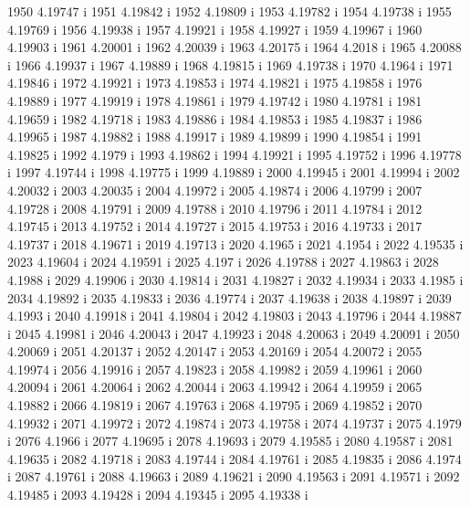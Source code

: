  1950  4.19747  i
 1951  4.19842  i
 1952  4.19809  i
 1953  4.19782  i
 1954  4.19738  i
 1955  4.19769  i
 1956  4.19938  i
 1957  4.19921  i
 1958  4.19927  i
 1959  4.19967  i
 1960  4.19903  i
 1961  4.20001  i
 1962  4.20039  i
 1963  4.20175  i
 1964  4.2018  i
 1965  4.20088  i
 1966  4.19937  i
 1967  4.19889  i
 1968  4.19815  i
 1969  4.19738  i
 1970  4.1964  i
 1971  4.19846  i
 1972  4.19921  i
 1973  4.19853  i
 1974  4.19821  i
 1975  4.19858  i
 1976  4.19889  i
 1977  4.19919  i
 1978  4.19861  i
 1979  4.19742  i
 1980  4.19781  i
 1981  4.19659  i
 1982  4.19718  i
 1983  4.19886  i
 1984  4.19853  i
 1985  4.19837  i
 1986  4.19965  i
 1987  4.19882  i
 1988  4.19917  i
 1989  4.19899  i
 1990  4.19854  i
 1991  4.19825  i
 1992  4.1979  i
 1993  4.19862  i
 1994  4.19921  i
 1995  4.19752  i
 1996  4.19778  i
 1997  4.19744  i
 1998  4.19775  i
 1999  4.19889  i
 2000  4.19945  i
 2001  4.19994  i
 2002  4.20032  i
 2003  4.20035  i
 2004  4.19972  i
 2005  4.19874  i
 2006  4.19799  i
 2007  4.19728  i
 2008  4.19791  i
 2009  4.19788  i
 2010  4.19796  i
 2011  4.19784  i
 2012  4.19745  i
 2013  4.19752  i
 2014  4.19727  i
 2015  4.19753  i
 2016  4.19733  i
 2017  4.19737  i
 2018  4.19671  i
 2019  4.19713  i
 2020  4.1965  i
 2021  4.1954  i
 2022  4.19535  i
 2023  4.19604  i
 2024  4.19591  i
 2025  4.197  i
 2026  4.19788  i
 2027  4.19863  i
 2028  4.1988  i
 2029  4.19906  i
 2030  4.19814  i
 2031  4.19827  i
 2032  4.19934  i
 2033  4.1985  i
 2034  4.19892  i
 2035  4.19833  i
 2036  4.19774  i
 2037  4.19638  i
 2038  4.19897  i
 2039  4.1993  i
 2040  4.19918  i
 2041  4.19804  i
 2042  4.19803  i
 2043  4.19796  i
 2044  4.19887  i
 2045  4.19981  i
 2046  4.20043  i
 2047  4.19923  i
 2048  4.20063  i
 2049  4.20091  i
 2050  4.20069  i
 2051  4.20137  i
 2052  4.20147  i
 2053  4.20169  i
 2054  4.20072  i
 2055  4.19974  i
 2056  4.19916  i
 2057  4.19823  i
 2058  4.19982  i
 2059  4.19961  i
 2060  4.20094  i
 2061  4.20064  i
 2062  4.20044  i
 2063  4.19942  i
 2064  4.19959  i
 2065  4.19882  i
 2066  4.19819  i
 2067  4.19763  i
 2068  4.19795  i
 2069  4.19852  i
 2070  4.19932  i
 2071  4.19972  i
 2072  4.19874  i
 2073  4.19758  i
 2074  4.19737  i
 2075  4.1979  i
 2076  4.1966  i
 2077  4.19695  i
 2078  4.19693  i
 2079  4.19585  i
 2080  4.19587  i
 2081  4.19635  i
 2082  4.19718  i
 2083  4.19744  i
 2084  4.19761  i
 2085  4.19835  i
 2086  4.1974  i
 2087  4.19761  i
 2088  4.19663  i
 2089  4.19621  i
 2090  4.19563  i
 2091  4.19571  i
 2092  4.19485  i
 2093  4.19428  i
 2094  4.19345  i
 2095  4.19338  i
